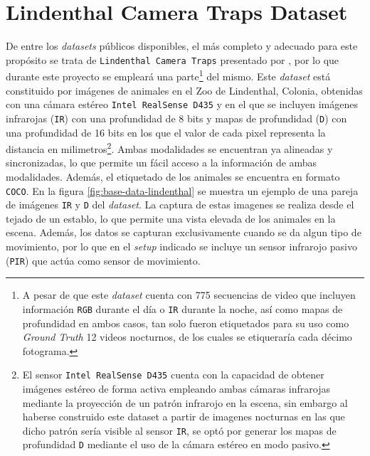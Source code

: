 \documentclass[12pt,a4paper]{report}
\begin{document}
\section{Lindenthal Camera Traps Dataset}
\label{sec:lindenthal_dataset}
De entre los \textit{datasets} públicos disponibles, el más completo y adecuado para este propósito se trata de \texttt{Lindenthal Camera Traps} presentado por \cite{haucke2021exploitingdepthinformationwildlife}, por lo que durante este proyecto se empleará una parte\footnote{A pesar de que este \textit{dataset} cuenta con 775 secuencias de video que incluyen información \texttt{RGB} durante el día o \texttt{IR} durante la noche, así como mapas de profundidad en ambos casos, tan solo fueron etiquetados para su uso como \textit{Ground Truth} 12 videos nocturnos, de los cuales se etiqueraría cada décimo fotograma.} del mismo. Este \textit{dataset} está constituido por imágenes de animales en el Zoo de Lindenthal, Colonia, obtenidas con una cámara estéreo \texttt{Intel RealSense D435} y en el que se incluyen imágenes infrarojas (\texttt{IR}) con una profundidad de 8 bits y mapas de profundidad (\texttt{D}) con una profundidad de 16 bits en los que el valor de cada pixel representa la distancia en milimetros\footnote{El sensor \texttt{Intel RealSense D435} cuenta con la capacidad de obtener imágenes estéreo de forma activa empleando ambas cámaras infrarojas mediante la proyección de un patrón infrarojo en la escena, sin embargo al haberse construido este dataset a partir de imagenes nocturnas en las que dicho patrón sería visible al sensor \texttt{IR}, se optó por generar los mapas de profundidad \texttt{D} mediante el uso de la cámara estéreo en modo pasivo.}. Ambas modalidades se encuentran ya alineadas y sincronizadas, lo que permite un fácil acceso a la información de ambas modalidades. Además, el etiquetado de los animales se encuentra en formato \texttt{COCO}. En la figura \ref{fig:base-data-lindenthal} se muestra un ejemplo de una pareja de imágenes \texttt{IR} y \texttt{D} del \textit{dataset}. La captura de estas imagenes se realiza desde el tejado de un establo, lo que permite una vista elevada de los animales en la escena. Además, los datos se capturan exclusivamente cuando se da algun tipo de movimiento, por lo que en el \textit{setup} indicado se incluye un sensor infrarojo pasivo (\texttt{PIR}) que actúa como sensor de movimiento.
\end{document}
